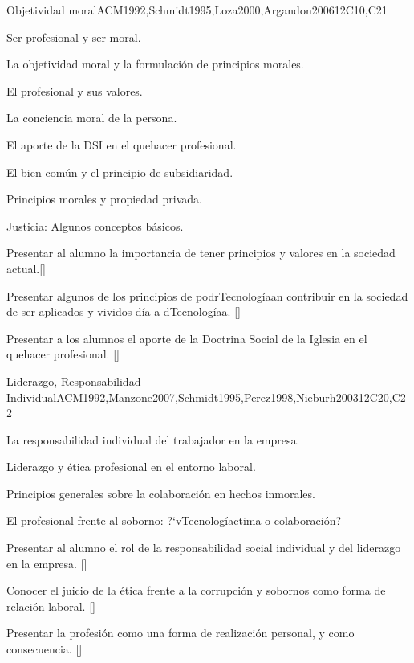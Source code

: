 \begin{syllabus}
\begin{unit}{}{Objetividad moral}{ACM1992,Schmidt1995,Loza2000,Argandon2006}{12}{C10,C21}
\begin{topics}
	\item Ser profesional y ser moral.
	\item La objetividad moral y la formulación de principios morales.
	\item El profesional y sus valores.
	\item La conciencia moral de la persona.
	\item El aporte de la DSI en el quehacer profesional.
	\item El bien común y el principio de subsidiaridad.
	\item Principios morales y propiedad privada.
	\item Justicia: Algunos conceptos básicos.
\end{topics}
\begin{learningoutcomes}
	\item Presentar al alumno la importancia de tener principios y valores en la sociedad actual.[\Usage]
	\item Presentar algunos de los principios de podrTecnologíaan contribuir en la sociedad de ser aplicados y vividos día a dTecnologíaa. [\Usage]
	\item Presentar a los alumnos el aporte de la Doctrina Social de la Iglesia en el quehacer profesional. [\Usage]
\end{learningoutcomes}
\end{unit}

\begin{unit}{}{Liderazgo, Responsabilidad Individual}{ACM1992,Manzone2007,Schmidt1995,Perez1998,Nieburh2003}{12}{C20,C22}
\begin{topics}
	\item La responsabilidad individual del trabajador en la empresa.
	\item Liderazgo y ética profesional en el entorno laboral.
	\item Principios generales sobre la colaboración en hechos inmorales.
	\item El profesional frente al soborno: ?`vTecnologíactima o colaboración?

\end{topics}
\begin{learningoutcomes}
	\item Presentar al alumno el rol de la responsabilidad social individual y del liderazgo en la empresa. [\Familiarity]
	\item Conocer el juicio de la ética frente a la corrupción y sobornos como forma de relación laboral. [\Familiarity]
	\item Presentar la profesión como una forma de realización personal, y como consecuencia. []
\end{learningoutcomes}
\end{unit}


\end{syllabus}

